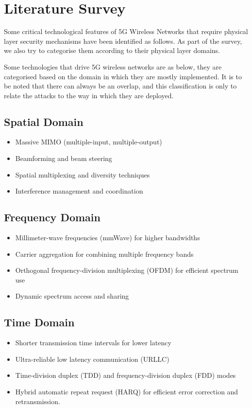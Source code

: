 \documentclass[conference]{IEEEtran}
\begin{document}
\section{Literature Survey}
Some critical technological features of 5G Wireless Networks that require physical layer security mechanisms have been identified as follows. As part of the survey, we also try to categorise them according to their physical layer domains.

Some technologies that drive 5G wireless networks are as below, they are categorised based on the domain in which they are mostly implemented. It is to be noted that there can always be an overlap, and this classification is only to relate the attacks to the way in which they are deployed.

\subsection*{Spatial Domain}
\begin{itemize}
    \item Massive MIMO (multiple-input, multiple-output)
\item Beamforming and beam steering
\item Spatial multiplexing and diversity techniques
\item Interference management and coordination
\end{itemize}

\subsection*{Frequency Domain}
\begin{itemize}
    \item Millimeter-wave frequencies (mmWave) for higher bandwidths
\item Carrier aggregation for combining multiple frequency bands
\item Orthogonal frequency-division multiplexing (OFDM) for efficient spectrum use
\item Dynamic spectrum access and sharing
\end{itemize}

\subsection*{Time Domain}
\begin{itemize}
\item Shorter transmission time intervals for lower latency
\item Ultra-reliable low latency communication (URLLC)
\item Time-division duplex (TDD) and frequency-division duplex (FDD) modes
\item Hybrid automatic repeat request (HARQ) for efficient error correction and retransmission.
\end{itemize}
\end{document}
